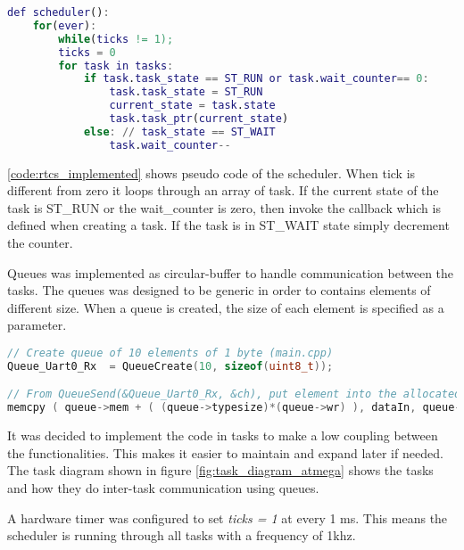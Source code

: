 \begin{lstlisting}[language = Matlab, caption = Pseudo code of the RTCS scheduler implemented, label=code:rtcs_implemented]
def scheduler():
	for(ever):
		while(ticks != 1);
		ticks = 0
		for task in tasks:
			if task.task_state == ST_RUN or task.wait_counter== 0:
				task.task_state = ST_RUN
				current_state = task.state
				task.task_ptr(current_state)
			else: // task_state == ST_WAIT
				task.wait_counter--
\end{lstlisting}

\ref{code:rtcs_implemented} shows pseudo code of the scheduler. When tick is different from zero it loops through an array of task. If the current state of the task is ST\_RUN or the wait\_counter is zero, then invoke the callback which is defined when creating a task. If the task is in ST\_WAIT state simply decrement the counter.

Queues was implemented as circular-buffer to handle communication between the tasks. The queues was designed to be generic in order to contains elements of different size. When a queue is created, the size of each element is specified as a parameter.

\begin{lstlisting}[language = C++, caption = Implementation of queues. Notice the queues are generic in size since the size of the element is given as parameter. When a element is put into the queue\, it is done by multiplying the elements size by the index of the next element in the queue and add that to the beginning of the memory allocated for the queue, label=code:rtcs_queue]
// Create queue of 10 elements of 1 byte (main.cpp)
Queue_Uart0_Rx  = QueueCreate(10, sizeof(uint8_t));

// From QueueSend(&Queue_Uart0_Rx, &ch), put element into the allocated memory.
memcpy ( queue->mem + ( (queue->typesize)*(queue->wr) ), dataIn, queue->typesize );
\end{lstlisting}


It was decided to implement the code in tasks to make a low coupling between the functionalities. This makes it easier to maintain and expand later if needed. The task diagram shown in figure \ref{fig:task_diagram_atmega} shows the tasks and how they do inter-task communication using queues.

A hardware timer was configured to set \textit{ticks = 1} at every 1 ms. This means the scheduler is running through all tasks with a frequency of 1khz.

